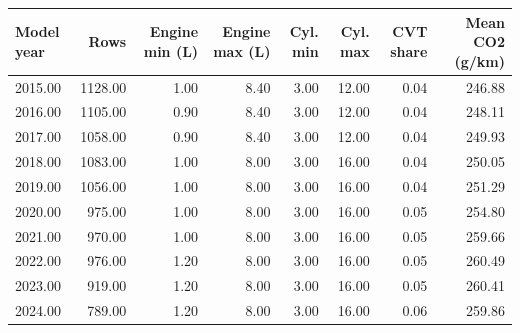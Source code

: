 \begin{tabular}{lrrrrrrr}
\toprule
Model year & Rows & Engine min (L) & Engine max (L) & Cyl. min & Cyl. max & CVT share & Mean CO2 (g/km) \\
\midrule
2015.00 & 1128.00 & 1.00 & 8.40 & 3.00 & 12.00 & 0.04 & 246.88 \\
2016.00 & 1105.00 & 0.90 & 8.40 & 3.00 & 12.00 & 0.04 & 248.11 \\
2017.00 & 1058.00 & 0.90 & 8.40 & 3.00 & 12.00 & 0.04 & 249.93 \\
2018.00 & 1083.00 & 1.00 & 8.00 & 3.00 & 16.00 & 0.04 & 250.05 \\
2019.00 & 1056.00 & 1.00 & 8.00 & 3.00 & 16.00 & 0.04 & 251.29 \\
2020.00 & 975.00 & 1.00 & 8.00 & 3.00 & 16.00 & 0.05 & 254.80 \\
2021.00 & 970.00 & 1.00 & 8.00 & 3.00 & 16.00 & 0.05 & 259.66 \\
2022.00 & 976.00 & 1.20 & 8.00 & 3.00 & 16.00 & 0.05 & 260.49 \\
2023.00 & 919.00 & 1.20 & 8.00 & 3.00 & 16.00 & 0.05 & 260.41 \\
2024.00 & 789.00 & 1.20 & 8.00 & 3.00 & 16.00 & 0.06 & 259.86 \\
\bottomrule
\end{tabular}
